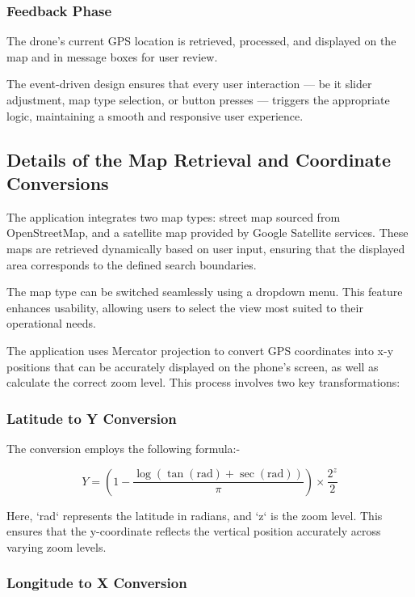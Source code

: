 \documentclass[conference]{IEEEtran}
\begin{document}
\subsubsection{Feedback Phase}
The drone’s current GPS location is retrieved, processed, and displayed on the map and in message boxes for user review.

The event-driven design ensures that every user interaction — be it slider adjustment, map type selection, or button presses — triggers the appropriate logic, maintaining a smooth and responsive user experience.

\subsection{Details of the Map Retrieval and Coordinate Conversions}

The application integrates two map types: street map sourced from OpenStreetMap, and a satellite map provided by Google Satellite services. These maps are retrieved dynamically based on user input, ensuring that the displayed area corresponds to the defined search boundaries.

The map type can be switched seamlessly using a dropdown menu. This feature enhances usability, allowing users to select the view most suited to their operational needs.


The application uses Mercator projection to convert GPS coordinates into x-y positions that can be accurately displayed on the phone’s screen, as well as calculate the correct zoom level. This process involves two key transformations:

\subsubsection{Latitude to Y Conversion}
   The conversion employs the following formula:-
   
   \[
   Y = \left( 1 - \frac{\log(\tan(\text{rad}) + \sec(\text{rad}))}{\pi} \right) \times \frac{2^z}{2}
   \]

   Here, `rad` represents the latitude in radians, and `z` is the zoom level. This ensures that the y-coordinate reflects the vertical position accurately across varying zoom levels.

   
\subsubsection{Longitude to X Conversion}
\end{document}
